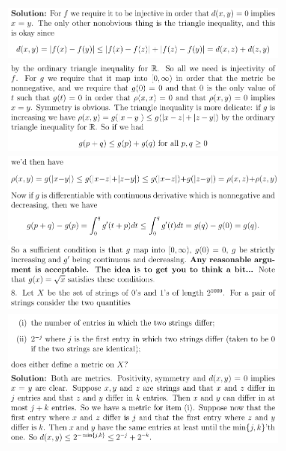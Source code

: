 \documentclass[8pt,landscape]{article}
\begin{document}
\begin{multicols}{3}
    \includegraphics[width=270]{072.png} \\
    \includegraphics[width=270]{073.png} \\
    \includegraphics[width=270]{074.png} \\
    \includegraphics[width=270]{075.png} \\
    \includegraphics[width=270]{076.png} \\
    \includegraphics[width=270]{077.png} \\

\end{multicols}
\end{document}
